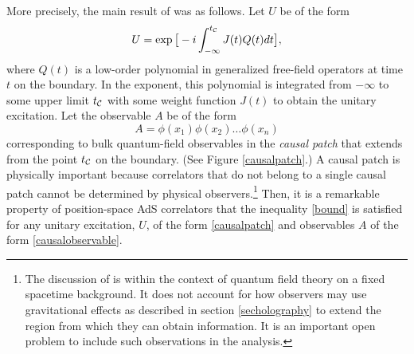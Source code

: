 \documentclass[12pt]{article}
\newcommand{\cop}[1]{#1}
\newcommand{\al}{\cop{A}} %
\def\tcaus{t_{\cal C}}
\newcommand{\be}{\begin{equation}}
\newcommand{\ee}{\end{equation}}
\begin{document}
More precisely, the main result of \cite{Raju:2016vsu} was as follows. Let $U$ be of the form
\be
\label{causalunitary}
U = \exp\big[-i \int_{-\infty}^{\tcaus} J(t) Q(t) d t \big],
\ee
where $Q(t)$ is a low-order polynomial in generalized free-field operators at time $t$ on the boundary. In the exponent, this polynomial is integrated from $-\infty$ to some upper limit $\tcaus$ with some weight function $J(t)$ to obtain the unitary excitation.   Let the observable $\al$ be of the form
\be
\label{causalobservable}
\al = \phi(x_1) \phi(x_2) \ldots \phi(x_n)
\ee
corresponding to bulk quantum-field observables in the {\em causal patch} that extends from the point $\tcaus$ on the boundary. (See Figure \ref{causalpatch}.) A causal patch is physically important \cite{Freivogel:2014fqa}  because correlators that do not belong to a single
causal patch cannot be determined by physical observers.\footnote{The discussion of \cite{Raju:2016vsu} is  within the context of quantum field theory on a fixed spacetime background. It does not account for  how observers
may use gravitational effects as described in section \ref{secholography} to extend the region from which they can obtain information. It is an important open problem to include such observations in the analysis.} Then, it is a remarkable property of position-space AdS correlators that
the inequality \eqref{bound} is satisfied for any unitary excitation, $U$, of the form \eqref{causalpatch} and observables $\al$ of the form \eqref{causalobservable}.
\end{document}
